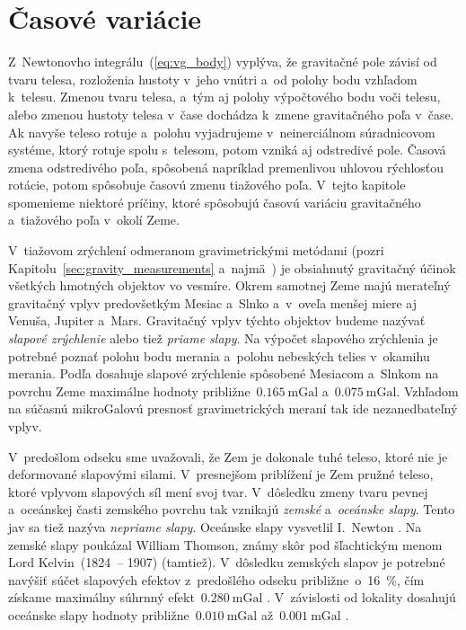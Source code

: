 \documentclass[a4paper, 12pt]{book}
\begin{document}
\section{Časové variácie}
\label{sec:time_variable_gravity}

Z~Newtonovho integrálu~(\ref{eq:vg_body}) vyplýva, že gravitačné pole závisí od 
tvaru telesa, rozloženia hustoty v~jeho vnútri a~od polohy bodu vzhľadom 
k~telesu.  Zmenou tvaru telesa, a~tým aj polohy výpočtového bodu voči telesu, 
alebo zmenou hustoty telesa v~čase dochádza k~zmene gravitačného poľa v~čase.  
Ak navyše teleso rotuje a~polohu vyjadrujeme v~neinerciálnom súradnicovom 
systéme, ktorý rotuje spolu s~telesom, potom vzniká aj odstredivé pole.  Časová 
zmena odstredivého poľa, spôsobená napríklad premenlivou uhlovou rýchlosťou 
rotácie, potom spôsobuje časovú zmenu tiažového poľa.  V~tejto kapitole 
spomenieme niektoré príčiny, ktoré spôsobujú časovú variáciu gravitačného 
a~tiažového poľa v~okolí Zeme.

V~tiažovom zrýchlení odmeranom gravimetrickými metódami (pozri 
Kapitolu~\ref{sec:gravity_measurements} a~najmä~\cite{Janak2010}) je obsiahnutý 
gravitačný účinok všetkých hmotných objektov vo vesmíre.  Okrem samotnej Zeme 
majú merateľný gravitačný vplyv predovšetkým Mesiac a~Slnko a~v~oveľa menšej 
miere aj Venuša, Jupiter a~Mars.  Gravitačný vplyv týchto objektov budeme 
nazývať \emph{slapové zrýchlenie} alebo tiež \emph{priame slapy}.  Na výpočet 
slapového zrýchlenia je potrebné poznať polohu bodu merania a~polohu nebeských 
telies v~okamihu merania.  Podľa \textcite{Torge1989} dosahuje slapové 
zrýchlenie spôsobené Mesiacom a~Slnkom na povrchu Zeme maximálne hodnoty 
približne~$0.165\ \mathrm{mGal}$ a~$0.075\ \mathrm{mGal}$.  Vzhľadom na súčasnú 
mikroGalovú presnosť gravimetrických meraní tak ide nezanedbateľný vplyv.

V~predošlom odseku sme uvažovali, že Zem je dokonale tuhé teleso, ktoré nie je 
deformované slapovými silami.  V~presnejšom priblížení je Zem pružné teleso, 
ktoré vplyvom slapových síl mení svoj tvar.  V~dôsledku zmeny tvaru pevnej 
a~oceánskej časti zemského povrchu tak vznikajú \emph{zemské} a~\emph{oceánske 
slapy}.  Tento jav sa tiež nazýva \emph{nepriame slapy}.  Oceánske slapy 
vysvetlil I.~Newton \parencite{Torge1989}.  Na zemské slapy poukázal William 
Thomson, známy skôr pod šľachtickým menom Lord Kelvin~(1824~-- 1907) (tamtiež).  
V~dôsledku zemských slapov je potrebné navýšiť súčet slapových efektov 
z~predošlého odseku približne~o~16~\%, čím získame maximálny súhrnný 
efekt~$0.280\ \mathrm{mGal}$ \parencite{Torge1989}.  V~závislosti od lokality 
dosahujú oceánske slapy hodnoty približne~$0.010\ \mathrm{mGal}$ až~$0.001\ 
\mathrm{mGal}$ \parencite{Torge1989}.
\end{document}
